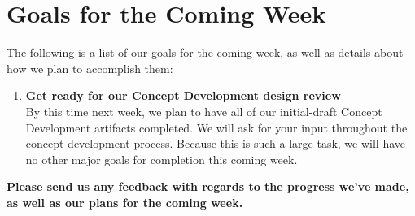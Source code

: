 \documentclass[]{../auvsi_doc}
\begin{document}
\section{Goals for the Coming Week}

The following is a list of our goals for the coming week, as well as details about how we plan to accomplish them:

\begin{enumerate}
\item \textbf{Get ready for our Concept Development design review}\\
By this time next week, we plan to have all of our initial-draft Concept Development artifacts completed. We will ask for your input throughout the concept development process. Because this is such a large task, we will have no other major goals for completion this coming week.
\end{enumerate}

\textbf{Please send us any feedback with regards to the progress we've made, as well as our plans for the coming week.}
\end{document}
